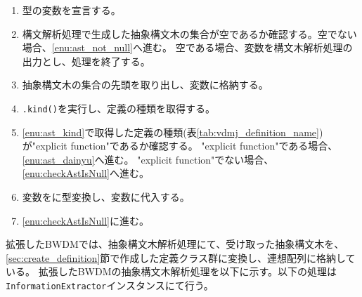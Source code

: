 \documentclass[uplatex, report, a4j, 10pt]{jsbook}
\newcommand\ttt[1]{\texttt{#1}}
\begin{document}

\begin{enumerate}
  \item \TCExplicitFunctionDefinition{}型の変数\tcFunctionDefinition{}を宣言する。
  \item\label{enu:checkAstIsNull} 構文解析処理で生成した抽象構文木の集合が空であるか確認する。空でない場合、\ref{enu:ast_not_null}へ進む。
        空である場合、変数\tcFunctionDefinition{}を構文木解析処理の出力とし、処理を終了する。
  \item\label{enu:ast_not_null} 抽象構文木の集合の先頭を取り出し、変数\astDefinition{}に格納する。
  \item\label{enu:ast_kind} \astDefinition{}\ttt{.kind()}を実行し、定義の種類を取得する。
  \item \ref{enu:ast_kind}で取得した定義の種類(表\ref{tab:vdmj_definition_name})が"explicit function"であるか確認する。
        "explicit function"である場合、\ref{enu:ast_dainyu}へ進む。
        "explicit function"でない場合、\ref{enu:checkAstIsNull}へ進む。
  \item\label{enu:ast_dainyu} 変数\astDefinition{}を\TCExplicitFunctionDefinition{}に型変換し、変数\tcFunctionDefinition{}に代入する。
  \item \ref{enu:checkAstIsNull}に進む。
\end{enumerate}


拡張したBWDMでは、抽象構文木解析処理にて、受け取った抽象構文木を、\ref{sec:create_definition}節で作成した定義クラス群に変換し、連想配列に格納している。
拡張したBWDMの抽象構文木解析処理を以下に示す。以下の処理は\ttt{InformationExtractor}インスタンスにて行う。
\end{document}
